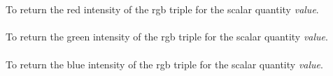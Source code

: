  \\
\\
To return the red intensity of the rgb triple for the scalar quantity
{\em value}. \\

\\
To return the green intensity of the rgb triple for the scalar quantity
{\em value}. \\

\\
To return the blue intensity of the rgb triple for the scalar quantity
{\em value}. \\